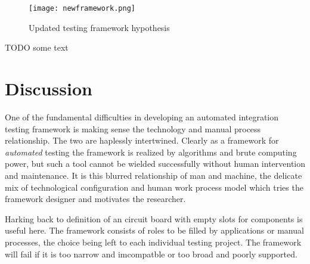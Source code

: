 \documentclass[12pt,a4paper,oneside,pdftex]{report}
\begin{document}
{\begin{figure}[H]
\centering
\texttt{[image: newframework.png]}
\caption{Updated testing framework hypothesis}
\label{fig:newframework}
\end{figure}

TODO some text



\chapter{Discussion}
\label{chapter:discussion}

\begin{comment}
- the mixing of manual and technical aspects
- examples of technical, contextual needs, flexible software
- manual, involving stakeholders and getting support, maintaining the model
- the result is generalizable in parts at least (manual process part that is)

- integration testing neglected subject
- staging post or more
- component testing
- doing away with integration, testing as software grows
- responsibilities per integration, difficult to maintain otherwise, whose responsibiltiy?
- getting to the beef - a compromise

- capture replay remains debateable
\end{comment}

One of the fundamental difficulties in developing an automated integration testing framework is making sense the technology and manual process relationship. The two are haplessly intertwined. Clearly as a framework for \emph{automated} testing the framework is realized by algorithms and brute computing power, but such a tool cannot be wielded successfully without human intervention and maintenance. It is this blurred relationship of man and machine, the delicate mix of technological configuration and human work process model which tries the framework designer and motivates the researcher. 

Harking back to \citep{pezze2008software} definition of an circuit board with empty slots for components is useful here. The framework consists of roles to be filled by applications or manual processes, the choice being left to each individual testing project. The framework will fail if it is too narrow and imcompatble or too broad and poorly supported.

}
\end{document}
